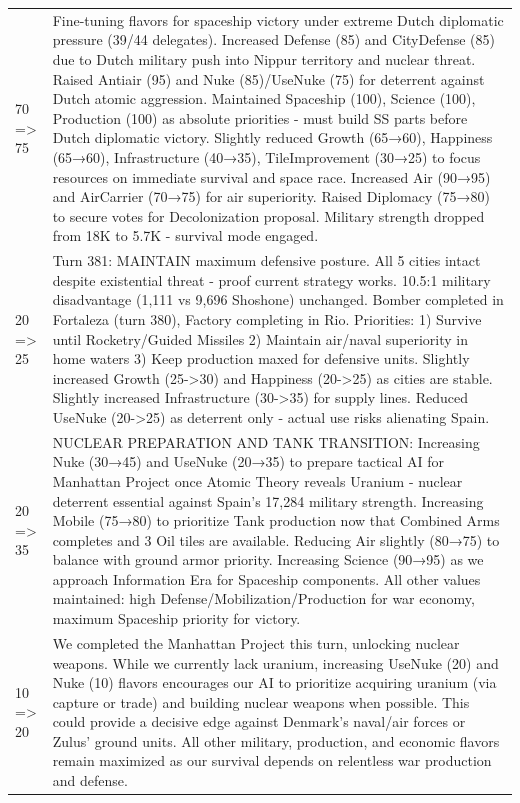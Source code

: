 \begin{longtable}{p{}p{}}
70 => 75 & Fine-tuning flavors for spaceship victory under extreme Dutch diplomatic pressure (39/44 delegates). Increased Defense (85) and CityDefense (85) due to Dutch military push into Nippur territory and nuclear threat. Raised Antiair (95) and Nuke (85)/UseNuke (75) for deterrent against Dutch atomic aggression. Maintained Spaceship (100), Science (100), Production (100) as absolute priorities - must build SS parts before Dutch diplomatic victory. Slightly reduced Growth (65→60), Happiness (65→60), Infrastructure (40→35), TileImprovement (30→25) to focus resources on immediate survival and space race. Increased Air (90→95) and AirCarrier (70→75) for air superiority. Raised Diplomacy (75→80) to secure votes for Decolonization proposal. Military strength dropped from 18K to 5.7K - survival mode engaged. \\
20 => 25 & Turn 381: MAINTAIN maximum defensive posture. All 5 cities intact despite existential threat - proof current strategy works. 10.5:1 military disadvantage (1,111 vs 9,696 Shoshone) unchanged. Bomber completed in Fortaleza (turn 380), Factory completing in Rio. Priorities: 1) Survive until Rocketry/Guided Missiles 2) Maintain air/naval superiority in home waters 3) Keep production maxed for defensive units. Slightly increased Growth (25->30) and Happiness (20->25) as cities are stable. Slightly increased Infrastructure (30->35) for supply lines. Reduced UseNuke (20->25) as deterrent only - actual use risks alienating Spain. \\
20 => 35 & NUCLEAR PREPARATION AND TANK TRANSITION: Increasing Nuke (30→45) and UseNuke (20→35) to prepare tactical AI for Manhattan Project once Atomic Theory reveals Uranium - nuclear deterrent essential against Spain's 17,284 military strength. Increasing Mobile (75→80) to prioritize Tank production now that Combined Arms completes and 3 Oil tiles are available. Reducing Air slightly (80→75) to balance with ground armor priority. Increasing Science (90→95) as we approach Information Era for Spaceship components. All other values maintained: high Defense/Mobilization/Production for war economy, maximum Spaceship priority for victory. \\
10 => 20 & We completed the Manhattan Project this turn, unlocking nuclear weapons. While we currently lack uranium, increasing UseNuke (20) and Nuke (10) flavors encourages our AI to prioritize acquiring uranium (via capture or trade) and building nuclear weapons when possible. This could provide a decisive edge against Denmark's naval/air forces or Zulus' ground units. All other military, production, and economic flavors remain maximized as our survival depends on relentless war production and defense. \\

\end{longtable}
